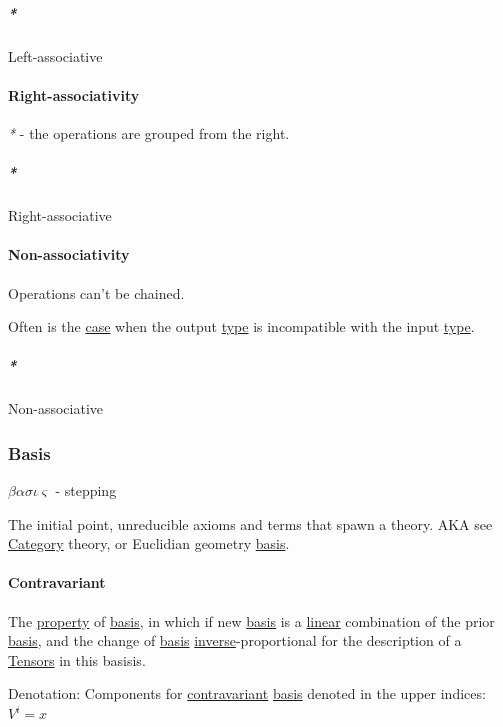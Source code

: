\documentclass[a4paper,14pt,oneside]{book}
\begin{document}
\subparagraph{\emph{*}}
\label{sec:org69a5d8d}

\label{org9699d18}Left-associative

\paragraph{\label{org089c27d}Right-associativity}
\label{sec:orgb241bf9}
\emph{*} - the operations are grouped from the right.

\subparagraph{\emph{*}}
\label{sec:org79db1fc}

\label{org0bd619d}Right-associative

\paragraph{\label{org52dbd5e}Non-associativity}
\label{sec:org982753f}
Operations can't be chained.

Often is the \hyperref[org62549a2]{case} when the output \hyperref[org43dd29c]{type} is incompatible with the input \hyperref[org43dd29c]{type}.

\subparagraph{\emph{*}}
\label{sec:org8a20cb8}

\label{orge6c2c99}Non-associative

\subsubsection{\label{org69d8f32}Basis}
\label{sec:org9967556}
\(\beta\alpha\sigma\iota\varsigma\) - stepping

The initial point, unreducible axioms and terms that spawn a theory.
AKA see \hyperref[org9246444]{Category} theory, or Euclidian geometry \hyperref[org69d8f32]{basis}.

\paragraph{\label{org205b436}Contravariant}
\label{sec:org8bd1c43}
The \hyperref[orgc187516]{property} of \hyperref[org69d8f32]{basis}, in which if new \hyperref[org69d8f32]{basis} is a \hyperref[org72bffc1]{linear} combination of the prior \hyperref[org69d8f32]{basis}, and the change of \hyperref[org69d8f32]{basis} \hyperref[org94418f8]{inverse}-proportional for the description of a \hyperref[orgcdee9d6]{Tensors} in this basisis.

Denotation:
Components for \hyperref[org205b436]{contravariant} \hyperref[org69d8f32]{basis} denoted in the upper indices:
\(V^{i} = x\)
\end{document}
